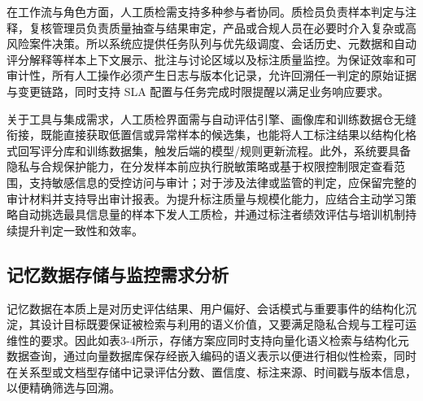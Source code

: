 在工作流与角色方面，人工质检需支持多种参与者协同。质检员负责样本判定与注释，复核管理员负责质量抽查与结果审定，产品或合规人员在必要时介入复杂或高风险案件决策。所以系统应提供任务队列与优先级调度、会话历史、元数据和自动评分解释等样本上下文展示、批注与讨论区域以及标注质量监控。为保证效率和可审计性，所有人工操作必须产生日志与版本化记录，允许回溯任一判定的原始证据与变更链路，同时支持 SLA 配置与任务完成时限提醒以满足业务响应要求。

关于工具与集成需求，人工质检界面需与自动评估引擎、画像库和训练数据仓无缝衔接，既能直接获取低置信或异常样本的候选集，也能将人工标注结果以结构化格式回写评分库和训练数据集，触发后端的模型/规则更新流程。此外，系统要具备隐私与合规保护能力，在分发样本前应执行脱敏策略或基于权限控制限定查看范围，支持敏感信息的受控访问与审计；对于涉及法律或监管的判定，应保留完整的审计材料并支持导出审计报表。为提升标注质量与规模化能力，应结合主动学习策略自动挑选最具信息量的样本下发人工质检，并通过标注者绩效评估与培训机制持续提升判定一致性和效率。

\subsection{记忆数据存储与监控需求分析}
记忆数据在本质上是对历史评估结果、用户偏好、会话模式与重要事件的结构化沉淀，其设计目标既要保证被检索与利用的语义价值，又要满足隐私合规与工程可运维性的要求。因此如表3-4所示，存储方案应同时支持向量化语义检索与结构化元数据查询，通过向量数据库保存经嵌入编码的语义表示以便进行相似性检索，同时在关系型或文档型存储中记录评估分数、置信度、标注来源、时间戳与版本信息，以便精确筛选与回溯\cite{gao2024retrievalaugmentedgenerationlargelanguage}。

